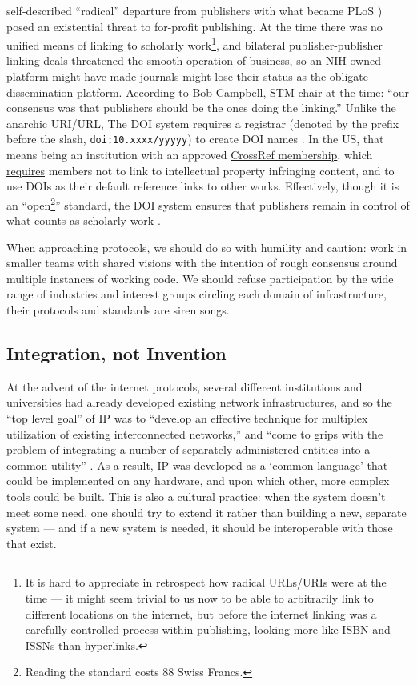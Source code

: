 self-described ``radical'' departure from publishers with what became
PLoS \citep{varmusArtPoliticsScience2009, robertsBuildingGenBankPublished2001} ) posed an existential threat to
for-profit publishing. At the time there was no unified means of linking
to scholarly work\footnote{It is hard to appreciate in retrospect how
  radical URLs/URIs were at the time --- it might seem trivial to us now
  to be able to arbitrarily link to different locations on the internet,
  but before the internet linking was a carefully controlled process
  within publishing, looking more like ISBN and ISSNs than hyperlinks.},
and bilateral publisher-publisher linking deals threatened the smooth
operation of business, so an NIH-owned platform might have made journals
might lose their status as the obligate dissemination platform.
According to Bob Campbell, STM chair at the time: ``our consensus was
that publishers should be the ones doing the linking.'' Unlike the
anarchic URI/URL, The DOI system requires a registrar (denoted by the
prefix before the slash, \texttt{doi:10.xxxx/yyyyy}) to create DOI names
\citep{isoISO2632420122012} . In the US, that means being an
institution with an approved
\href{https://www.crossref.org/services/content-registration/}{CrossRef
membership}, which
\href{https://www.crossref.org/membership/terms/}{requires} members not
to link to intellectual property infringing content, and to use DOIs as
their default reference links to other works. Effectively, though it is
an ``open\footnote{Reading the standard costs 88 Swiss Francs.}''
standard, the DOI system ensures that publishers remain in control of
what counts as scholarly work \citep{crossrefFormationCrossRefShort2009} .

When approaching protocols, we should do so with humility and caution:
work in smaller teams with shared visions with the intention of rough
consensus around multiple instances of working code. We should refuse
participation by the wide range of industries and interest groups
circling each domain of infrastructure, their protocols and standards
are siren songs.

\hypertarget{integration-not-invention}{%
\subsection{Integration, not
Invention}\label{integration-not-invention}}

At the advent of the internet protocols, several different institutions
and universities had already developed existing network infrastructures,
and so the ``top level goal'' of IP was to ``develop an effective
technique for multiplex utilization of existing interconnected
networks,'' and ``come to grips with the problem of integrating a number
of separately administered entities into a common utility'' \citep{clarkDesignPhilosophyDARPA1988} . As a result, IP was developed as a
`common language' that could be implemented on any hardware, and upon
which other, more complex tools could be built. This is also a cultural
practice: when the system doesn't meet some need, one should try to
extend it rather than building a new, separate system --- and if a new
system is needed, it should be interoperable with those that exist.

